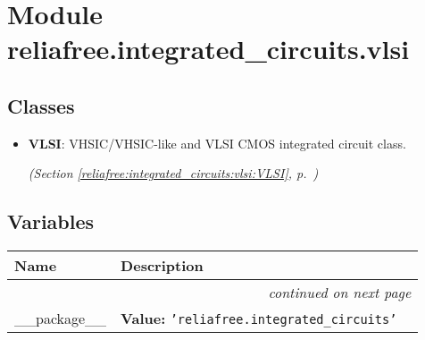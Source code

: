 %
%
%


\section{Module reliafree.integrated\_circuits.vlsi}

    \label{reliafree:integrated_circuits:vlsi}


\subsection{Classes}

\begin{itemize}  \setlength{\parskip}{0ex}
  \item \textbf{VLSI}: VHSIC/VHSIC-like and VLSI CMOS integrated circuit class.



  \textit{(Section \ref{reliafree:integrated_circuits:vlsi:VLSI}, p.~\pageref{reliafree:integrated_circuits:vlsi:VLSI})}

\end{itemize}


  \subsection{Variables}

    \vspace{-1cm}
\hspace{\varindent}\begin{longtable}{|p{\varnamewidth}|p{\vardescrwidth}|l}
\cline{1-2}
\cline{1-2} \centering \textbf{Name} & \centering \textbf{Description}& \\
\cline{1-2}
\endhead\cline{1-2}\multicolumn{3}{r}{\small\textit{continued on next page}}\\\endfoot\cline{1-2}
\endlastfoot\raggedright \_\-\_\-p\-a\-c\-k\-a\-g\-e\-\_\-\_\- & \raggedright \textbf{Value:} 
{\tt \texttt{'}\texttt{reliafree.integrated\_circuits}\texttt{'}}&\\
\cline{1-2}
\end{longtable}

